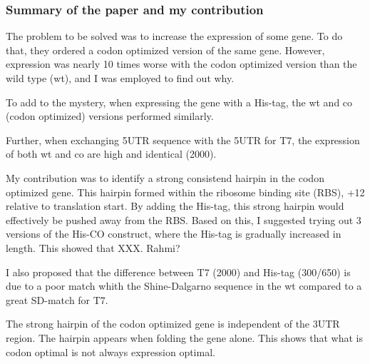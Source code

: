 %

\subsubsection{Summary of the paper and my contribution}
The problem to be solved was to increase the expression of some gene. To do
that, they ordered a codon optimized version of the same gene. However,
expression was nearly 10 times worse with the codon optimized version than the
wild type (wt), and I was employed to find out why.

To add to the mystery, when expressing the gene with a His-tag, the wt and co
(codon optimized) versions performed similarly.

Further, when exchanging 5UTR sequence with the 5UTR for T7, the expression of
both wt and co are high and identical (2000).

My contribution was to identify a strong consistend hairpin in the codon
optimized gene. This hairpin formed within the ribosome binding site (RBS), +12
relative to translation start. By adding the His-tag, this strong hairpin would
effectively be pushed away from the RBS. Based on this, I suggested trying out
3 versions of the His-CO construct, where the His-tag is gradually increased in
length. This showed that XXX. Rahmi?

I also proposed that the difference between T7 (2000) and His-tag (300/650) is
due to a poor match whith the Shine-Dalgarno sequence in the wt compared to a
great SD-match for T7.

The strong hairpin of the codon optimized gene is independent of the 3UTR
region. The hairpin appears when folding the gene alone. This shows that what
is codon optimal is not always expression optimal.
